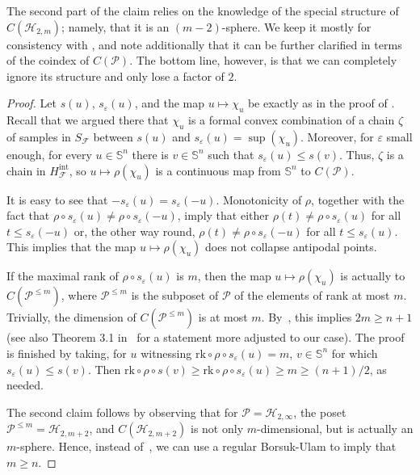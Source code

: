 \documentclass{article} %
\newcommand{\F}{\mathcal{F}}
\renewcommand{\H}{\mathcal{H}}
\renewcommand{\SS}{\mathbb{S}}
\newcommand{\PP}{\mathcal{P}}
\newcommand{\intr}{\mathrm{int}}
\newcommand{\rk}{\mathrm{rk}}
\begin{document}
The second part of the claim relies on the knowledge of the special structure of $C(\H_{2, m})$; namely, that it is an $(m-2)$-sphere. We keep it mostly for consistency with , and note additionally that it can be further clarified in terms of the coindex of $C(\PP)$. The bottom line, however, is that we can completely ignore its structure and only lose a factor of $2$.
\begin{proof}
	Let $s(u)$, $s_\varepsilon(u)$, and the map $u\mapsto \chi_u$ be exactly as in the proof of . Recall that we argued there that $\chi_u$ is a formal convex combination of a chain $\zeta$ of samples in $S_\F$ between $s(u)$ and $s_\varepsilon(u) = \sup(\chi_u)$. Moreover, for $\varepsilon$ small enough, for every $u\in \SS^n$ there is $v\in \SS^n$ such that $s_\varepsilon(u) \leq s(v)$. Thus, $\zeta$ is a chain in $H^\intr_\F$, so $u\mapsto \rho(\chi_u)$ is a continuous map from $\SS^n$ to $C(\PP)$.
	
	It is easy to see that $-s_\varepsilon(u) = s_\varepsilon(-u)$. Monotonicity of $\rho$, together with the fact that $\rho\circ s_\varepsilon(u) \neq \rho\circ s_\varepsilon(-u)$, imply that either $\rho(t) \neq \rho \circ s_\varepsilon(u)$ for all $t\leq s_\varepsilon(-u)$ or, the other way round, $\rho(t) \neq \rho\circ s_\varepsilon(-u)$ for all $t\leq s_\varepsilon(u)$. This implies that the map $u\mapsto \rho(\chi_u)$ does not collapse antipodal points.
	
	If the maximal rank of $\rho \circ s_\varepsilon(u)$ is $m$, then the map $u\mapsto \rho(\chi_u)$ is actually to $C(\PP^{\leq m})$, where $\PP^{\leq m}$ is the subposet of $\PP$ of the elements of rank at most $m$. Trivially, the dimension of $C(\PP^{\leq m})$ is at most $m$. By~\cite{Jaw02}, this implies $2m \geq n+1$ (see also Theorem 3.1 in~\cite{chase2024local} for a statement more adjusted to our case). The proof is finished by taking, for $u$ witnessing $\rk \circ \rho \circ s_\varepsilon(u) = m$, $v\in \SS^n$ for which $s_\varepsilon(u) \leq s(v)$. Then $\rk \circ \rho \circ s(v) \geq \rk \circ \rho \circ s_\varepsilon(u) \geq m \geq (n+1)/2$, as needed.
	
	The second claim follows by observing that for $\PP = \H_{2, \infty}$, the poset $\PP^{\leq m} = \H_{2, m+2}$, and $C(\H_{2,m+2})$ is not only $m$-dimensional, but is actually an $m$-sphere. Hence, instead of~\cite{Jaw02}, we can use a regular Borsuk-Ulam to imply that ${m\geq n}$. 
\end{proof}
\end{document}
